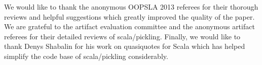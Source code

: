 \documentclass[10pt]{sigplanconf}
\theoremstyle{definition}
\theoremstyle{definition}
\begin{document}

\acks

We would like to thank the anonymous OOPSLA 2013 referees for their thorough
reviews and helpful suggestions which greatly improved the quality of the
paper. We are grateful to the artifact evaluation committee and the anonymous
artifact referees for their detailed reviews of scala/pickling.
Finally, we would like to thank Denys Shabalin for his work on quasiquotes for
Scala which has helped simplify the code base of scala/pickling
considerably.








\begin{spacing}{0.9}


\end{spacing}
\end{document}
